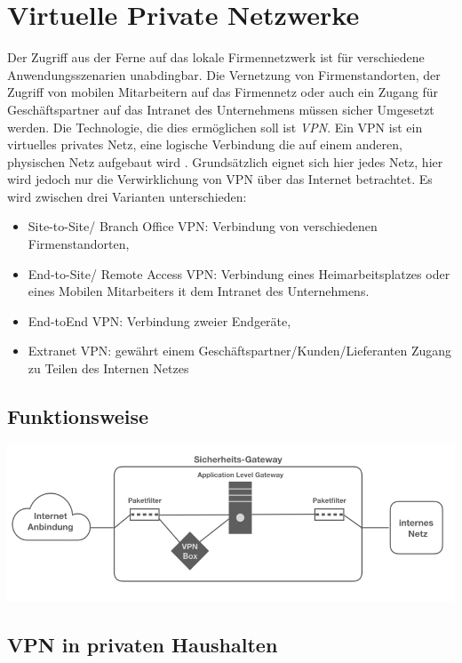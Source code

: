 \chapter{Virtuelle Private Netzwerke}

Der Zugriff aus der Ferne auf das lokale Firmennetzwerk ist für verschiedene Anwendungsszenarien unabdingbar. Die Vernetzung von Firmenstandorten, der Zugriff von mobilen Mitarbeitern auf das Firmennetz oder auch ein Zugang für Geschäftspartner auf das Intranet des Unternehmens müssen sicher Umgesetzt werden.
Die Technologie, die dies ermöglichen soll ist \emph{VPN}. Ein VPN ist ein virtuelles privates Netz, eine logische Verbindung die auf einem anderen, physischen Netz aufgebaut wird \cite{zisler2018computer}. Grundsätzlich eignet sich hier jedes Netz, hier wird jedoch nur die Verwirklichung von VPN über das Internet betrachtet. Es wird zwischen drei Varianten unterschieden:
\begin{itemize}
  \item Site-to-Site/ Branch Office VPN: Verbindung von verschiedenen Firmenstandorten,
  \item End-to-Site/ Remote Access VPN: Verbindung eines Heimarbeitsplatzes oder eines Mobilen Mitarbeiters it dem Intranet des Unternehmens.
  \item End-toEnd VPN: Verbindung zweier Endgeräte,
  \item Extranet VPN: gewährt einem Geschäftspartner/Kunden/Lieferanten Zugang zu Teilen des Internen Netzes 
\end{itemize}


\section{Funktionsweise}





\includegraphics[width=\linewidth]{vpnarchitektur.jpeg}

\section{VPN in privaten Haushalten}